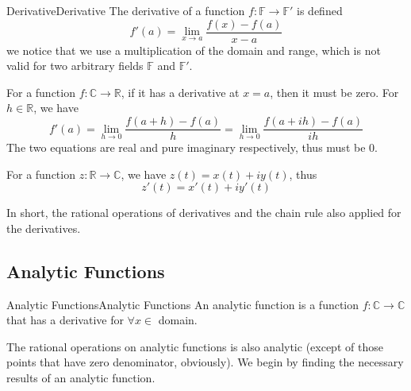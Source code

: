 \documentclass[../main.tex]{subfiles}
\begin{document}
\begin{definition}{Derivative}{Derivative}
The derivative of a function $f: \mathbb{F}\rightarrow \mathbb{F}'$ is defined
\begin{equation*}
f'(a) = \lim_{x \to a} \frac{f(x)-f(a)}{x-a}
\end{equation*}
we notice that we use a multiplication of the domain and range, which is not valid for two arbitrary fields $\mathbb{F}$ and $\mathbb{F}'$.
\end{definition}

For a function $f: \mathbb{C}\rightarrow \mathbb{R}$, if it has a derivative at $x=a$, then it must be zero. For $h\in \mathbb{R}$, we have
\begin{equation*}
f'(a) = \lim_{h \to 0} \frac{f(a+h)-f(a)}{h} = \lim_{h \to 0} \frac{f(a+ih)-f(a)}{ih}
\end{equation*}
The two equations are real and pure imaginary respectively, thus must be $0$.

For a function $z: \mathbb{R}\rightarrow \mathbb{C}$, we have $z(t) = x(t)+iy(t)$, thus
\begin{equation*}
z'(t)=x'(t)+iy'(t)
\end{equation*}

In short, the rational operations of derivatives and the chain rule also applied for the derivatives.


\subsection{Analytic Functions}

\begin{definition}{Analytic Functions}{Analytic Functions}
An analytic function is a function $f: \mathbb{C}\rightarrow \mathbb{C}$ that has a derivative for $\forall x\in $ domain.
\end{definition}

The rational operations on analytic functions is also analytic (except of those points that have zero denominator, obviously). We begin by finding the necessary results of an analytic function.
\end{document}
